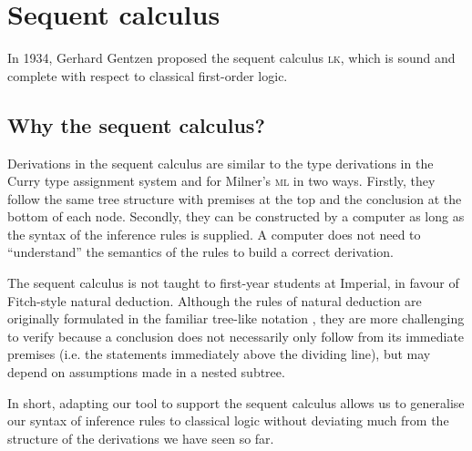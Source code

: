 \section{Sequent calculus}
In 1934, Gerhard Gentzen proposed the sequent calculus \textsc{lk}\cite{gentzen:1969}, which is sound and complete with respect to classical first-order logic.

\subsection{Why the sequent calculus?}
Derivations in the sequent calculus are similar to the type derivations in the Curry type assignment system and for Milner's \textsc{ml} in two ways. Firstly, they follow the same tree structure with premises at the top and the conclusion at the bottom of each node. Secondly, they can be constructed by a computer as long as the syntax of the inference rules is supplied. A computer does not need to ``understand'' the semantics of the rules to build a correct derivation.

The sequent calculus is not taught to first-year students at Imperial, in favour of Fitch-style natural deduction. Although the rules of natural deduction are originally formulated in the familiar tree-like notation \cite{gentzen:1969}, they are more challenging to verify because a conclusion does not necessarily only follow from its immediate premises (i.e. the statements immediately above the dividing line), but may depend on assumptions made in a nested subtree.

In short, adapting our tool to support the sequent calculus allows us to generalise our syntax of inference rules to classical logic without deviating much from the structure of the derivations we have seen so far.

